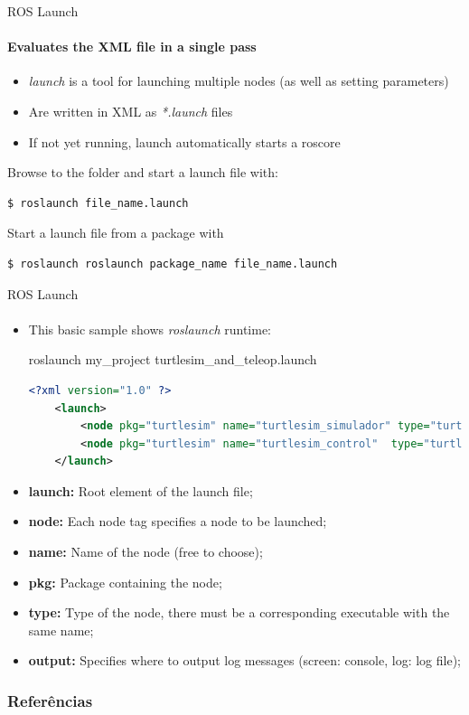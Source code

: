\documentclass[aspectratio=169]{beamer}
\begin{document}
\begin{frame}[fragile]{ROS Launch}
	\framesubtitle{Evaluates the XML file in a single pass}
	\begin{itemize}
		\item \textit{launch} is a tool for launching multiple nodes (as well as setting parameters)
		\item Are written in XML as \textit{*.launch} files
		\item If not yet running, launch automatically starts a roscore
	\end{itemize}

	Browse to the folder and start a launch file with:
	
	\begin{lstlisting}[language=bash]
		$ roslaunch file_name.launch
	\end{lstlisting}

	Start a launch file from a package with

	\begin{lstlisting}[language=bash]
		$ roslaunch roslaunch package_name file_name.launch
	\end{lstlisting}
\end{frame}



\begin{frame}[fragile]{ROS Launch}
	\framesubtitle{}

	\begin{itemize}
		\item This basic sample shows \textit{roslaunch} runtime:
	
	\begin{block}{roslaunch my\_project turtlesim\_and\_teleop.launch}
		\begin{lstlisting}[language=XML]
	<?xml version="1.0" ?>
	<launch>
		<node pkg="turtlesim" name="turtlesim_simulador" type="turtlesim_node"></node>
		<node pkg="turtlesim" name="turtlesim_control"  type="turtle_teleop_key"></node>
	</launch>
		\end{lstlisting}
	\end{block}

		\item \textbf{launch:} Root element of the launch file;
		\item \textbf{node:} Each node tag specifies a node to be launched;
		\item \textbf{name:} Name of the node (free to choose);
		\item \textbf{pkg:} Package containing the node;
		\item \textbf{type:} Type of the node, there must be a corresponding executable with the same name;
		\item \textbf{output:} Specifies where to output log messages (screen: console, log: log file);
	
	\end{itemize}

\end{frame}

\begin{frame}[t, allowframebreaks]
	\frametitle{Referências}
	
\end{frame}
\end{document}
